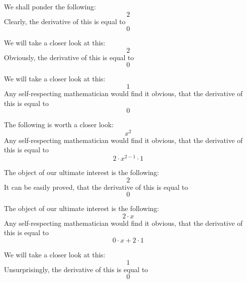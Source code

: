 \documentclass{article}
\begin{document}
We shall ponder the following:
\begin{equation}
2 
\end{equation}
Clearly, the derivative of this is equal to
\begin{equation}
0 
\end{equation}

We will take a closer look at this:
\begin{equation}
2 
\end{equation}
Obviously, the derivative of this is equal to
\begin{equation}
0 
\end{equation}

We will take a closer look at this:
\begin{equation}
1 
\end{equation}
Any self-respecting mathematician would find it obvious, that the derivative of this is equal to
\begin{equation}
0 
\end{equation}

The following is worth a closer look:
\begin{equation}
x ^{2 } 
\end{equation}
Any self-respecting mathematician would find it obvious, that the derivative of this is equal to
\begin{equation}
2 \cdot x ^{2 - 1 } \cdot 1 
\end{equation}

The object of our ultimate interest is the following:
\begin{equation}
2 
\end{equation}
It can be easily proved, that the derivative of this is equal to
\begin{equation}
0 
\end{equation}

The object of our ultimate interest is the following:
\begin{equation}
2 \cdot x 
\end{equation}
Any self-respecting mathematician would find it obvious, that the derivative of this is equal to
\begin{equation}
0 \cdot x + 2 \cdot 1 
\end{equation}

We will take a closer look at this:
\begin{equation}
1 
\end{equation}
Unsurprisingly, the derivative of this is equal to
\begin{equation}
0 
\end{equation}
\end{document}
